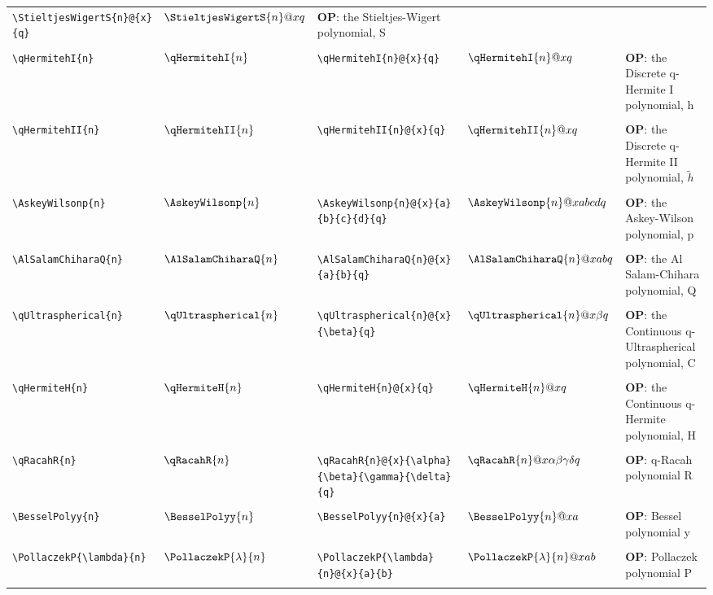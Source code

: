 \begin{supertabular}{ll|ll|p{2in}}
\verb~\StieltjesWigertS{n}@{x}{q}~ & $\StieltjesWigertS{n}@{x}{q}$ & 
\textbf{OP}: the Stieltjes-Wigert polynomial, S\\*
&&&&\\[-1ex]
\verb~\qHermitehI{n}~ & $\qHermitehI{n}$ & 
\verb~\qHermitehI{n}@{x}{q}~ & $\qHermitehI{n}@{x}{q}$ & 
\textbf{OP}: the Discrete q-Hermite I polynomial, h\\*
&&&&\\[-1ex]
\verb~\qHermitehII{n}~ & $\qHermitehII{n}$ & 
\verb~\qHermitehII{n}@{x}{q}~ & $\qHermitehII{n}@{x}{q}$ & 
\textbf{OP}: the Discrete q-Hermite II polynomial, $\tilde{h}$\\*
&&&&\\[-1ex]
\verb~\AskeyWilsonp{n}~ & $\AskeyWilsonp{n}$ & 
\verb~\AskeyWilsonp{n}@{x}{a}{b}{c}{d}{q}~ & $\AskeyWilsonp{n}@{x}{a}{b}{c}{d}{q}$ & 
\textbf{OP}: the Askey-Wilson polynomial, p\\*
&&&&\\[-1ex]
\verb~\AlSalamChiharaQ{n}~ & $\AlSalamChiharaQ{n}$ & 
\verb~\AlSalamChiharaQ{n}@{x}{a}{b}{q}~ & $\AlSalamChiharaQ{n}@{x}{a}{b}{q}$ & 
\textbf{OP}: the Al Salam-Chihara polynomial, Q\\*
&&&&\\[-1ex]
\verb~\qUltraspherical{n}~ & $\qUltraspherical{n}$ & 
\verb~\qUltraspherical{n}@{x}{\beta}{q}~ & $\qUltraspherical{n}@{x}{\beta}{q}$ & 
\textbf{OP}: the Continuous q-Ultraspherical polynomial, C\\*
&&&&\\[-1ex]
\verb~\qHermiteH{n}~ & $\qHermiteH{n}$ & 
\verb~\qHermiteH{n}@{x}{q}~ & $\qHermiteH{n}@{x}{q}$ & 
\textbf{OP}: the Continuous q-Hermite polynomial, H\\*
&&&&\\[-1ex]
\verb~\qRacahR{n}~ & $\qRacahR{n}$ & 
\verb~\qRacahR{n}@{x}{\alpha}{\beta}{\gamma}{\delta}{q}~ & $\qRacahR{n}@{x}{\alpha}{\beta}{\gamma}{\delta}{q}$ & 
\textbf{OP}: q-Racah polynomial R\\*
&&&&\\[-1ex]
\verb~\BesselPolyy{n}~ & $\BesselPolyy{n}$ & 
\verb~\BesselPolyy{n}@{x}{a}~ & $\BesselPolyy{n}@{x}{a}$ & 
\textbf{OP}: Bessel polynomial y\\*
&&&&\\[-1ex]
\verb~\PollaczekP{\lambda}{n}~ & $\PollaczekP{\lambda}{n}$ & 
\verb~\PollaczekP{\lambda}{n}@{x}{a}{b}~ & $\PollaczekP{\lambda}{n}@{x}{a}{b}$ & 
\textbf{OP}: Pollaczek polynomial P\\*
&&&&\\[-1ex]

\end{supertabular}
